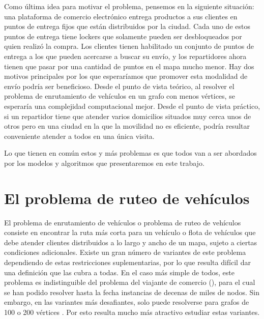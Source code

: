 Como última idea para motivar el problema, pensemos en la siguiente situación: una plataforma de comercio electrónico entrega productos a sus clientes en puntos de entrega fijos que están distribuidos por la ciudad. Cada uno de estos puntos de entrega tiene lockers que solamente pueden ser desbloqueados por quien realizó la compra. Los clientes tienen habilitado un conjunto de puntos de entrega a los que pueden acercarse a buscar su envío, y los repartidores ahora tienen que pasar por una cantidad de puntos en el mapa mucho menor. Hay dos motivos principales por los que esperaríamos que promover esta modalidad de envío podría ser beneficioso. Desde el punto de vista teórico, al resolver el problema de enrutamiento de vehículos en un grafo con menos vértices, se esperaría una complejidad computacional mejor. Desde el punto de vista práctico, si un repartidor tiene que atender varios domicilios situados muy cerca unos de otros pero en una ciudad en la que la movilidad no es eficiente, podría resultar conveniente atender a todos en una única visita. 

Lo que tienen en común estos y más problemas es que todos van a ser abordados por los modelos y algoritmos que presentaremos en este trabajo.  


\section{El problema de ruteo de vehículos}

El problema de enrutamiento de vehículos o problema de ruteo de vehículos consiste en encontrar la ruta más corta para un vehículo o flota de vehículos que debe atender clientes distribuidos a lo largo y ancho de un mapa, sujeto a ciertas condiciones adicionales. Existe un gran número de variantes de este problema dependiendo de estas restricciones suplementarias, por lo que resulta difícil dar una definición que las cubra a todas. En el caso más simple de todos, este problema es indistinguible del problema del viajante de comercio (), para el cual se han podido resolver hasta la fecha instancias de decenas de miles de nodos. Sin embargo, en las variantes más desafiantes,  solo puede resolverse para grafos de 100 o 200 vértices \cite{laporte}. Por esto resulta mucho más atractivo estudiar estas variantes.

